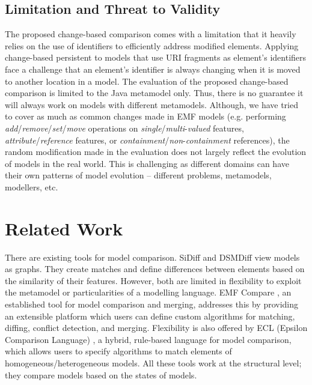 \documentclass{llncs}
\begin{document}
\subsection{Limitation and Threat to Validity}
\label{sec:limitation_and_Threat_to_validity}
The proposed change-based comparison comes with a limitation that it heavily relies on the use of identifiers to efficiently address modified elements. Applying change-based persistent to models that use URI fragments as element's identifiers face a challenge that an element's identifier is always changing when it is moved to another location in a model. The evaluation of the proposed change-based comparison is limited to the Java metamodel only. Thus, there is no guarantee it will always work on models with different metamodels. Although, we have tried to cover as much as common changes made in EMF models (e.g. performing \textit{add}/\textit{remove}/\textit{set}/\textit{move} operations on \textit{single}/\textit{multi}-\textit{valued} features, \textit{attribute}/\textit{reference} features, or \textit{containment}/\textit{non}-\textit{containment} references), the random modification made in the evaluation does not largely reflect the evolution of models in the real world. This is challenging as different domains can have their own patterns of model evolution -- different problems, metamodels, modellers, etc.

\section{Related Work}
\label{sec:related_work}
There are existing tools for model comparison. SiDiff \cite{Treude2007SiDiff} and DSMDiff \cite{lin2009dsmdiff} view models as graphs. They create matches and define differences between elements based on the similarity of their features. However, both are limited in flexibility to exploit the metamodel or particularities of a modelling language. EMF Compare \cite{emfcompare2018developer}, an established tool for model comparison and merging, addresses this by providing an extensible platform which users can define custom algorithms for matching, diffing, conflict detection, and merging. Flexibility is also offered by ECL (Epsilon Comparison Language) \cite{kolovos2009ecl}, a hybrid, rule-based language for model comparison, which allows users to specify algorithms to match elements of homogeneous/heterogeneous models. All these tools work at the structural level; they compare models based on the states of models.
\end{document}
